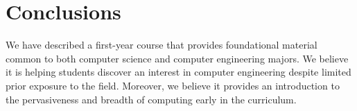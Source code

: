 \section{Conclusions}
\label{sec:conclude}


We have described a first-year course that provides foundational material
common to  both computer science and computer engineering majors.
We believe it is helping students discover an interest in computer
engineering despite limited prior exposure to the field.
Moreover, we believe it provides an introduction to the pervasiveness and
breadth of computing early in the curriculum.
